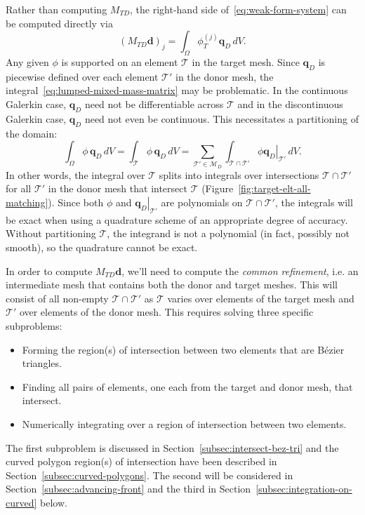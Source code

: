 \documentclass[letterpaper,10pt]{article}
\theoremstyle{definition}
\begin{document}
Rather than computing \(M_{TD}\), the right-hand side
of~\eqref{eq:weak-form-system} can be computed directly via
\begin{equation}\label{eq:lumped-mixed-mass-matrix}
\left(M_{TD} \bm{d}\right)_j = \int_{\Omega} \phi_T^{(j)} \bm{q}_D \, dV.
\end{equation}
Any given \(\phi\) is supported on an element \(\mathcal{T}\) in the
target mesh. Since \(\bm{q}_D\) is piecewise defined over each element
\(\mathcal{T}'\) in the donor mesh, the
integral~\eqref{eq:lumped-mixed-mass-matrix} may be problematic.
In the continuous Galerkin case, \(\bm{q}_D\) need not be differentiable
across \(\mathcal{T}\) and in the discontinuous Galerkin case,
\(\bm{q}_D\) need not even be continuous. This necessitates a
partitioning of the domain:
\begin{equation}
\int_{\Omega} \phi \, \bm{q}_D \, dV =
  \int_{\mathcal{T}} \phi \, \bm{q}_D \, dV =
  \sum_{\mathcal{T}' \in \mathcal{M}_D} \int_{\mathcal{T} \cap \mathcal{T}'}
    \phi \left.\bm{q}_D\right|_{\mathcal{T}'} \, dV.
\end{equation}
In other words, the integral over \(\mathcal{T}\) splits into integrals
over intersections \(\mathcal{T} \cap \mathcal{T}'\) for all
\(\mathcal{T}'\) in the donor mesh that intersect \(\mathcal{T}\)
(Figure~\ref{fig:target-elt-all-matching}). Since both \(\phi\) and
\(\left.\bm{q}_D\right|_{\mathcal{T}'}\) are polynomials on
\(\mathcal{T} \cap \mathcal{T}'\), the integrals will be exact when
using a quadrature scheme of an appropriate degree of accuracy.
Without partitioning \(\mathcal{T}\), the integrand is not a polynomial
(in fact, possibly not smooth), so the quadrature cannot be exact.

In order to compute \(M_{TD} \bm{d}\), we'll need to compute the
\emph{common refinement}, i.e. an intermediate mesh that contains
both the donor and target meshes. This will consist of all non-empty
\(\mathcal{T} \cap \mathcal{T}'\) as \(\mathcal{T}\) varies over
elements of the target mesh and \(\mathcal{T}'\) over elements of the
donor mesh. This requires solving three specific subproblems:
\begin{itemize}
\itemsep 0em
\item Forming the region(s) of intersection between two elements that
  are B\'{e}zier triangles.
\item Finding all pairs of elements, one each from the target and donor mesh,
  that intersect.
\item Numerically integrating over a region of intersection between two
  elements.
\end{itemize}
The first subproblem is discussed in
Section~\ref{subsec:intersect-bez-tri}
and the curved polygon region(s) of intersection have been described
in Section~\ref{subsec:curved-polygons}. The second will be considered
in Section~\ref{subsec:advancing-front} and the third in
Section~\ref{subsec:integration-on-curved} below.
\end{document}
